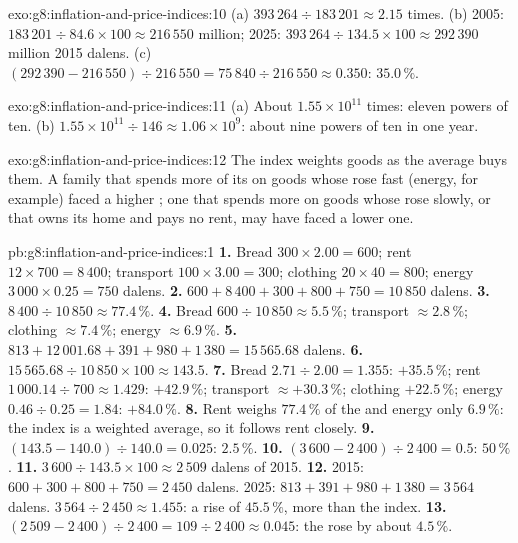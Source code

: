 \begin{solution}{exo:g8:inflation-and-price-indices:10}
(a) $393\,264 \div 183\,201 \approx 2.15$ times. (b) 2005: $183\,201 \div 84.6 \times 100 \approx
216\,550$ million; 2025: $393\,264 \div 134.5 \times 100 \approx 292\,390$ million 2015 dalens.
(c) $(292\,390 - 216\,550) \div 216\,550 = 75\,840 \div 216\,550 \approx 0.350$: $35.0\,\%$.
\end{solution}

\begin{solution}{exo:g8:inflation-and-price-indices:11}
(a) About $1.55 \times 10^{11}$ times: eleven powers of ten. (b) $1.55 \times 10^{11} \div 146
\approx 1.06 \times 10^{9}$: about nine powers of ten in one year.
\end{solution}

\begin{solution}{exo:g8:inflation-and-price-indices:12}
The index weights goods as the average  buys them. A family that spends more of its 
on goods whose  rose fast (energy, for example) faced a higher ; one that spends
more on goods whose  rose slowly, or that owns its home and pays no rent, may have faced a lower
one.
\end{solution}

\begin{solution}{pb:g8:inflation-and-price-indices:1}
\textbf{1.} Bread $300 \times 2.00 = 600$; rent $12 \times 700 = 8\,400$; transport $100 \times 3.00 =
300$; clothing $20 \times 40 = 800$; energy $3\,000 \times 0.25 = 750$ dalens.
\textbf{2.} $600 + 8\,400 + 300 + 800 + 750 = 10\,850$ dalens.
\textbf{3.} $8\,400 \div 10\,850 \approx 77.4\,\%$.
\textbf{4.} Bread $600 \div 10\,850 \approx 5.5\,\%$; transport $\approx 2.8\,\%$; clothing $\approx
7.4\,\%$; energy $\approx 6.9\,\%$.
\textbf{5.} $813 + 12\,001.68 + 391 + 980 + 1\,380 = 15\,565.68$ dalens.
\textbf{6.} $15\,565.68 \div 10\,850 \times 100 \approx 143.5$.
\textbf{7.} Bread $2.71 \div 2.00 = 1.355$: $+35.5\,\%$; rent $1\,000.14 \div 700 \approx 1.429$:
$+42.9\,\%$; transport $\approx +30.3\,\%$; clothing $+22.5\,\%$; energy $0.46 \div 0.25 = 1.84$:
$+84.0\,\%$.
\textbf{8.} Rent weighs $77.4\,\%$ of the  and energy only $6.9\,\%$: the index is a weighted
average, so it follows rent closely.
\textbf{9.} $(143.5 - 140.0) \div 140.0 = 0.025$: $2.5\,\%$.
\textbf{10.} $(3\,600 - 2\,400) \div 2\,400 = 0.5$: $50\,\%$.
\textbf{11.} $3\,600 \div 143.5 \times 100 \approx 2\,509$ dalens of 2015.
\textbf{12.} 2015: $600 + 300 + 800 + 750 = 2\,450$ dalens. 2025: $813 + 391 + 980 + 1\,380 = 3\,564$
dalens. $3\,564 \div 2\,450 \approx 1.455$: a rise of $45.5\,\%$, more than the index.
\textbf{13.} $(2\,509 - 2\,400) \div 2\,400 = 109 \div 2\,400 \approx 0.045$: the  rose by
about $4.5\,\%$.
\end{solution}
